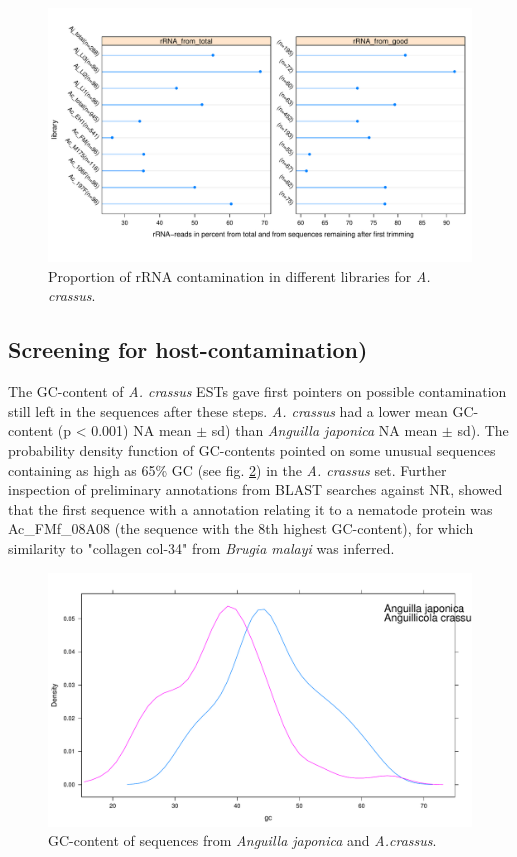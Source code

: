 \documentclass[12pt,a4paper]{article}
\begin{document}
\begin{figure}[ht]
  \centering \advance\leftskip-2.275cm
\includegraphics{pilot-006}
\caption{Proportion of rRNA contamination in different libraries for
  \textit{A. crassus}.}
\label{fig:rRNA}
\end{figure}


\subsection*{Screening for host-contamination)}

The GC-content of \textit{A. crassus} ESTs gave first pointers on
possible contamination still left in the sequences after these
steps. \textit{A. crassus} had a lower mean GC-content (p < 0.001)
NA
mean $\pm$ sd) than \textit{Anguilla japonica}
NA
mean $\pm$ sd). The probability density function of GC-contents
pointed on some unusual sequences containing as high as 65\% GC (see
fig. \ref{fig:GC}) in the \textit{A. crassus} set. Further inspection
of preliminary annotations from BLAST searches against NR, showed that
the first sequence with a annotation relating it to a nematode protein
was Ac\_FMf\_08A08 (the sequence with the 8th highest GC-content), for
which similarity to "collagen col-34" from \textit{Brugia malayi} was
inferred.

\begin{figure}[ht]
  \centering \advance\leftskip-2.275cm
\includegraphics{pilot-008}
\caption{GC-content of sequences from \textit{Anguilla japonica} and
  \textit{A.crassus}.}
\label{fig:GC}
\end{figure}
\end{document}
